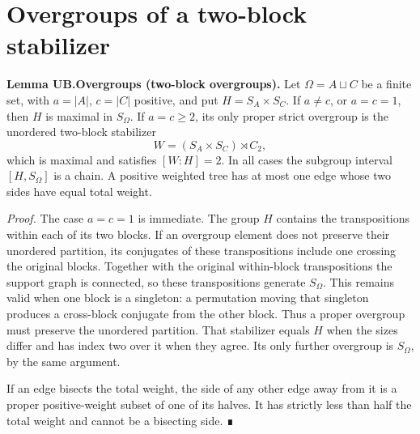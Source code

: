 \section{Overgroups of a two-block stabilizer}
\textbf{Lemma UB.Overgroups (two-block overgroups).} Let \(\Omega=A\sqcup C\) be a finite set, with \(a=|A|\), \(c=|C|\) positive, and put \(H=S_A\times S_C\). If \(a\ne c\), or \(a=c=1\), then \(H\) is maximal in \(S_\Omega\). If \(a=c\geq2\), its only proper strict overgroup is the unordered two-block stabilizer \[
W=(S_A\times S_C)\rtimes C_2,
\] which is maximal and satisfies \([W:H]=2\). In all cases the subgroup interval \([H,S_\Omega]\) is a chain. A positive weighted tree has at most one edge whose two sides have equal total weight.

\emph{Proof.} The case \(a=c=1\) is immediate. The group \(H\) contains the transpositions within each of its two blocks. If an overgroup element does not preserve their unordered partition, its conjugates of these transpositions include one crossing the original blocks. Together with the original within-block transpositions the support graph is connected, so these transpositions generate \(S_\Omega\). This remains valid when one block is a singleton: a permutation moving that singleton produces a cross-block conjugate from the other block. Thus a proper overgroup must preserve the unordered partition. That stabilizer equals \(H\) when the sizes differ and has index two over it when they agree. Its only further overgroup is \(S_\Omega\), by the same argument.

If an edge bisects the total weight, the side of any other edge away from it is a proper positive-weight subset of one of its halves. It has strictly less than half the total weight and cannot be a bisecting side. ∎

